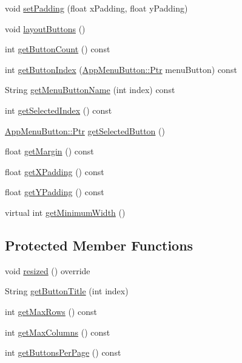 \begin{DoxyCompactItemize}
void \mbox{\hyperlink{classAppMenuFolder_a2023b6471b3db87629dbcd70b3ef4c2b}{set\+Padding}} (float x\+Padding, float y\+Padding)
\item 
void \mbox{\hyperlink{classAppMenuFolder_a97610e29efc6cd59c3771823de4bd495}{layout\+Buttons}} ()
\item 
int \mbox{\hyperlink{classAppMenuFolder_a74c22a106dbef4a9e66cb5ec8a6f402e}{get\+Button\+Count}} () const
\item 
int \mbox{\hyperlink{classAppMenuFolder_a82cefa07059bc6f6208024f6310a82fd}{get\+Button\+Index}} (\mbox{\hyperlink{classAppMenuButton_aeb692efb6a933970de8eac14e5e71544}{App\+Menu\+Button\+::\+Ptr}} menu\+Button) const
\item 
String \mbox{\hyperlink{classAppMenuFolder_a2284abcccdf73647d1009456fa67dc79}{get\+Menu\+Button\+Name}} (int index) const
\item 
int \mbox{\hyperlink{classAppMenuFolder_adb267a2cbeeb2f32251bda3ec8010d62}{get\+Selected\+Index}} () const
\item 
\mbox{\hyperlink{classAppMenuButton_aeb692efb6a933970de8eac14e5e71544}{App\+Menu\+Button\+::\+Ptr}} \mbox{\hyperlink{classAppMenuFolder_a5b3a153cc2634a5804b2cd9b33f25105}{get\+Selected\+Button}} ()
\item 
float \mbox{\hyperlink{classAppMenuFolder_a3b57b4273a72020916825601ab453cf7}{get\+Margin}} () const
\item 
float \mbox{\hyperlink{classAppMenuFolder_a9a6361cc4669dfaaf08159b09cddfe3e}{get\+X\+Padding}} () const
\item 
float \mbox{\hyperlink{classAppMenuFolder_a5ee8ea67c84cf8c412ff77a3233ec6ad}{get\+Y\+Padding}} () const
\item 
virtual int \mbox{\hyperlink{classAppMenuFolder_a0c46e9cfa9d2c3d5db1b0e8fe5d00fb9}{get\+Minimum\+Width}} ()
\end{DoxyCompactItemize}
\subsection*{Protected Member Functions}
\begin{DoxyCompactItemize}
\item 
void \mbox{\hyperlink{classAppMenuFolder_a6f26d51ceaad1e1bb1aa0753fbe7e02f}{resized}} () override
\item 
String \mbox{\hyperlink{classAppMenuFolder_a7a3877a0355eabfb63d90a9c4bab1cc0}{get\+Button\+Title}} (int index)
\item 
int \mbox{\hyperlink{classAppMenuFolder_a0a229d968e406f5811b0d7ee32ea0273}{get\+Max\+Rows}} () const
\item 
int \mbox{\hyperlink{classAppMenuFolder_ac939a6904f7db98f2b0d3150b4b5b129}{get\+Max\+Columns}} () const
\item 
int \mbox{\hyperlink{classAppMenuFolder_a5f434395b72ae4de65d4941024e96017}{get\+Buttons\+Per\+Page}} () const
\end{DoxyCompactItemize}


